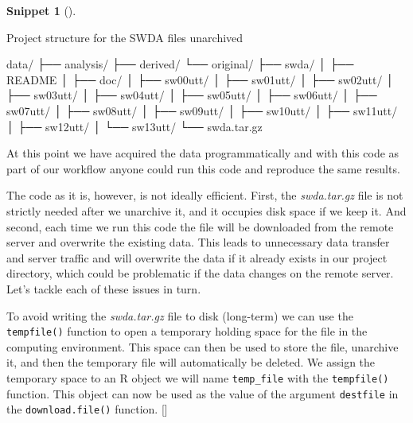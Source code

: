\documentclass[
  letterpaper,
  krantz1]{latex/krantz-mod}
\newenvironment{Shaded}{\begin{snugshade}}{\end{snugshade}}
\newcommand{\ExtensionTok}[1]{\textcolor[rgb]{0.00,0.00,0.00}{#1}}
\newcommand{\NormalTok}[1]{\textcolor[rgb]{0.00,0.00,0.00}{#1}}
\newcommand{\cindex}[1]{%
  \StrSubstitute{#1}{_}{\_}[\temp]%
  \index{\temp}%
}
\theoremstyle{definition}
\newtheorem{definition}{Snippet}[chapter]
\theoremstyle{definition}
\theoremstyle{remark}
\begin{document}
\begin{definition}[]\protect\hypertarget{def-acquire-swda-unarchive-location}{}\label{def-acquire-swda-unarchive-location}

Project structure for the SWDA files unarchived

\begin{Shaded}
\begin{Highlighting}[]
\ExtensionTok{data/}
\ExtensionTok{├──}\NormalTok{ analysis/}
\ExtensionTok{├──}\NormalTok{ derived/}
\ExtensionTok{└──}\NormalTok{ original/}
    \ExtensionTok{├──}\NormalTok{ swda/}
    \ExtensionTok{│}\NormalTok{   ├── README}
    \ExtensionTok{│}\NormalTok{   ├── doc/}
    \ExtensionTok{│}\NormalTok{   ├── sw00utt/}
    \ExtensionTok{│}\NormalTok{   ├── sw01utt/}
    \ExtensionTok{│}\NormalTok{   ├── sw02utt/}
    \ExtensionTok{│}\NormalTok{   ├── sw03utt/}
    \ExtensionTok{│}\NormalTok{   ├── sw04utt/}
    \ExtensionTok{│}\NormalTok{   ├── sw05utt/}
    \ExtensionTok{│}\NormalTok{   ├── sw06utt/}
    \ExtensionTok{│}\NormalTok{   ├── sw07utt/}
    \ExtensionTok{│}\NormalTok{   ├── sw08utt/}
    \ExtensionTok{│}\NormalTok{   ├── sw09utt/}
    \ExtensionTok{│}\NormalTok{   ├── sw10utt/}
    \ExtensionTok{│}\NormalTok{   ├── sw11utt/}
    \ExtensionTok{│}\NormalTok{   ├── sw12utt/}
    \ExtensionTok{│}\NormalTok{   └── sw13utt/}
    \ExtensionTok{└──}\NormalTok{ swda.tar.gz}
\end{Highlighting}
\end{Shaded}

\end{definition}

At this point we have acquired the data programmatically and with this
code as part of our workflow anyone could run this code and reproduce
the same results.

The code as it is, however, is not ideally efficient. First, the
\emph{swda.tar.gz} file is not strictly needed after we unarchive it,
and it occupies disk space if we keep it. And second, each time we run
this code the file will be downloaded from the remote server and
overwrite the existing data. This leads to unnecessary data transfer and
server traffic and will overwrite the data if it already exists in our
project directory, which could be problematic if the data changes on the
remote server. Let's tackle each of these issues in turn.

To avoid writing the \emph{swda.tar.gz} file to disk (long-term) we can
use the \texttt{tempfile()} function to open a temporary holding space
for the file in the computing environment. This space can then be used
to store the file, unarchive it, and then the temporary file will
automatically be deleted. We assign the temporary space to an R object
we will name \texttt{temp\_file} with the \texttt{tempfile()} function.
This object can now be used as the value of the argument
\texttt{destfile} in the \texttt{download.file()}
function.\cindex{tempfile()}
\end{document}
